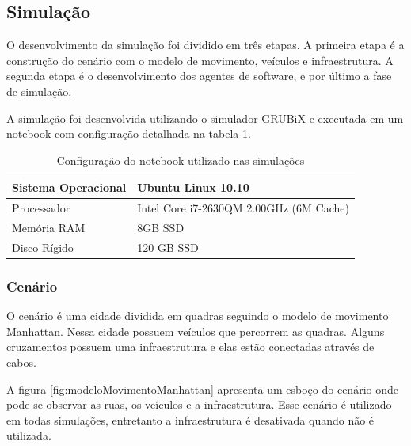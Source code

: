 \subsection{Simulação}
\label{subsec:simulacao}

O desenvolvimento da simulação foi dividido em três etapas. A primeira etapa é a construção do cenário com o modelo de movimento, veículos e infraestrutura. A segunda etapa é o desenvolvimento dos agentes de software, e por último a fase de simulação. 

A simulação foi desenvolvida utilizando o simulador GRUBiX e executada em um notebook com configuração detalhada na tabela \ref{tab:configuracaoNotebook}.

\begin{table}[ht]
	\caption{Configuração do notebook utilizado nas simulações}
	\centering
	\begin{tabular}{|l|l|}
		\hline
		Sistema Operacional & Ubuntu Linux 10.10 \\ \hline
		Processador & Intel Core i7-2630QM 2.00GHz (6M Cache) \\ \hline
		Memória RAM & 8GB SSD \\ \hline
		Disco Rígido & 120 GB SSD \\ \hline 
	\end{tabular}

	\label{tab:configuracaoNotebook}
\end{table}

\subsubsection{Cenário}

O cenário é uma cidade dividida em quadras seguindo o modelo de movimento Manhattan. Nessa cidade possuem veículos que percorrem as quadras. Alguns cruzamentos possuem uma infraestrutura e elas estão conectadas através de cabos. 

A figura \ref{fig:modeloMovimentoManhattan} apresenta um esboço do cenário onde pode-se observar as ruas, os veículos e a infraestrutura. Esse cenário é utilizado em todas simulações, entretanto a infraestrutura é desativada quando não é utilizada.

